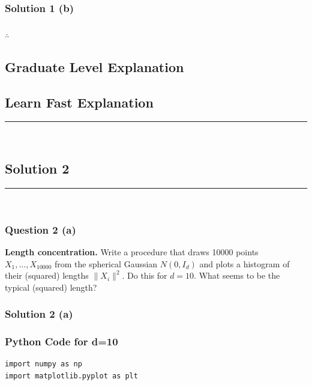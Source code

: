 \documentclass{article}
\begin{document}
\subsubsection*{Solution 1 (b)}


\subsubsection*{\normalfont}{$\therefore$ }

\subsection*{Graduate Level Explanation}

\subsection*{Learn Fast Explanation}

\noindent\rule{\textwidth}{0.4pt}\\

\newpage

\subsection*{Solution 2}
\noindent\rule{\textwidth}{0.4pt}\\
\subsubsection*{Question 2 (a)}
\begin{flushleft}
    \textbf{Length concentration.} Write a procedure that draws 10000 points $X_1, \ldots, X_{10000}$ from the spherical Gaussian $N(0, I_d)$ and plots a histogram of their (squared) lengths $\|X_i\|^2$. 
    Do this for $d=10$. What seems to be the typical (squared) length? 
\end{flushleft}

\subsubsection*{Solution 2 (a)}

\subsubsection*{Python Code for d=10}
\begin{lstlisting}
import numpy as np
import matplotlib.pyplot as plt
\end{lstlisting}
\end{document}
